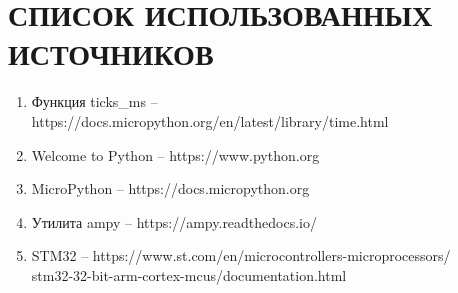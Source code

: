\documentclass{article}
\begin{document}
\clearpage\section*{СПИСОК ИСПОЛЬЗОВАННЫХ ИСТОЧНИКОВ}
\begin{enumerate}
	\item	Функция ticks\_ms -- https://docs.micropython.org/en/latest/library/time.html
	\item Welcome to Python -- https://www.python.org
	\item MicroPython --  https://docs.micropython.org
	\item Утилита ampy -- https://ampy.readthedocs.io/
	\item STM32 -- https://www.st.com/en/microcontrollers-microprocessors/\\
	stm32-32-bit-arm-cortex-mcus/documentation.html
\end{enumerate}
\end{document}
